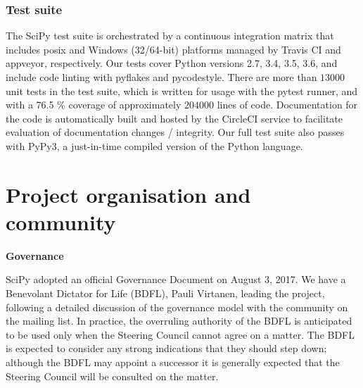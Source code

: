 \documentclass[fleqn,10pt]{wlscirep}
\begin{document}
    \subsubsection*{Test suite}
    The SciPy test suite is orchestrated by a continuous integration matrix
    that includes posix and Windows (32/64-bit) platforms managed by Travis CI and appveyor,
    respectively. Our tests cover Python versions 2.7, 3.4, 3.5, 3.6, and include
    code linting with pyflakes and pycodestyle. There are more than $13000$ unit
    tests in the test suite, which is written for usage with the pytest runner, and
    with a 76.5 \% coverage of approximately $204000$ lines
    of code. Documentation for the code is automatically built and hosted by the
    CircleCI service to facilitate evaluation of documentation changes / integrity.
    Our full test suite also passes with PyPy3, a just-in-time compiled version
    of the Python language.


\section*{Project organisation and community}

\textbf{Governance}

SciPy adopted an official Governance Document on August 3,
2017\cite{SciPyProjectGovernance}.
We have a Benevolant Dictator for Life (BDFL), Pauli Virtanen, leading the
project, following a detailed discussion of the governance model with the
community on the mailing list.  In practice, the overruling authority of the BDFL
is anticipated to be used only when the Steering Council cannot agree on a matter.
The BDFL is expected to consider any strong indications that they should step down;
although the BDFL may appoint a successor it is generally expected that the Steering
Council will be consulted on the matter.
\end{document}
